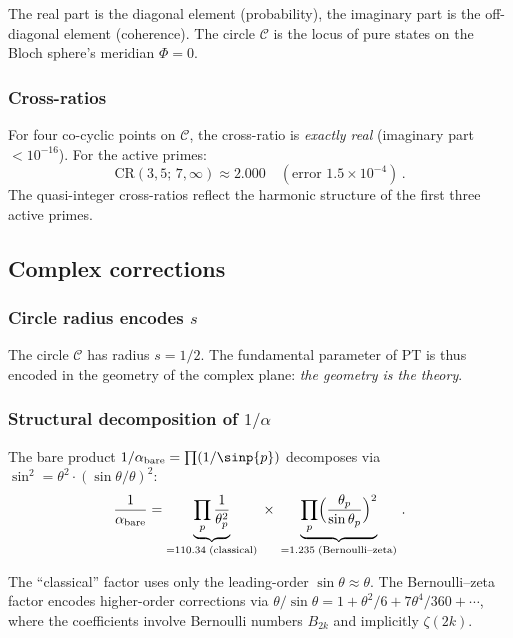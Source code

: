 \documentclass[12pt,a4paper]{article}
\begin{document}
The real part is the diagonal element (probability), the imaginary part
is the off-diagonal element (coherence). The circle $\mathcal{C}$ is the
locus of pure states on the Bloch sphere's meridian $\Phi = 0$.

\subsubsection{Cross-ratios}

For four co-cyclic points on $\mathcal{C}$, the cross-ratio is
\emph{exactly real} (imaginary part $< 10^{-16}$). For the active primes:
\[
  \mathrm{CR}(3, 5;\, 7, \infty) \approx 2.000
  \quad (\text{error } 1.5 \times 10^{-4})\,.
\]
The quasi-integer cross-ratios reflect the harmonic structure of
the first three active primes.


\subsection{Complex corrections}
\label{sec:cx_corrections}

\subsubsection{Circle radius encodes \texorpdfstring{$s$}{s}}

The circle $\mathcal{C}$ has radius $s = 1/2$. The fundamental parameter
of PT is thus encoded in the geometry of the complex plane: \emph{the
geometry is the theory}.

\subsubsection{Structural decomposition of \texorpdfstring{$1/\alpha$}{1/alpha}}
\label{subsec:cx_bernoulli}

The bare product $1/\alpha_{\mathrm{bare}} = \prod(1/\sinp{p})$
decomposes via $\sin^2 = \theta^2\cdot(\sin\theta/\theta)^2$:
\begin{equation}
  \frac{1}{\alpha_{\mathrm{bare}}}
  = \underbrace{\prod_p \frac{1}{\theta_p^2}}_{= 110.34\;\text{(classical)}}
  \;\times\;
  \underbrace{\prod_p \Bigl(\frac{\theta_p}{\sin\theta_p}\Bigr)^2}_{= 1.235\;\text{(Bernoulli--zeta)}}\,.
  \label{eq:alpha_decomp}
\end{equation}

The ``classical'' factor uses only the leading-order $\sin\theta \approx \theta$.
The Bernoulli--zeta factor encodes higher-order corrections via
$\theta/\sin\theta = 1 + \theta^2/6 + 7\theta^4/360 + \cdots$,
where the coefficients involve Bernoulli numbers $B_{2k}$ and
implicitly $\zeta(2k)$.
\end{document}
